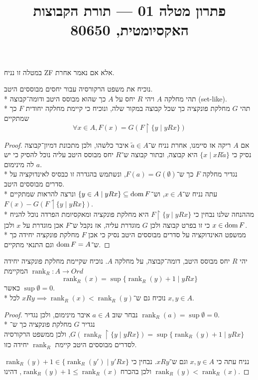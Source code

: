 
\title{פתרון מטלה 01 --- תורת הקבוצות האקסיומטית, 80650}

\DeclareMathOperator{\rank}{rank}


\maketitle
\maketitleprint{}
במטלה זו נניח ZF אלא אם נאמר אחרת.

\Question{}
נוכיח את משפט הרקורסיה עבור יחסים מבוססים היטב. \\*
תהי מחלקה $A$ ויהי $R$ יחס על $A$ כך שהוא מבוסס היטב ודומה־קבוצה (set-like). \\*
תהי $G$ מחלקת פונקציה כך שכל קבוצה במקור שלה, ונוכיח כי קיימת מחלקה יחודית $F$ כך שמתקיים
\[
	\forall x \in A, F(x) = G(F \upharpoonright \{y \mid y R x \})
\]
\begin{proof}
	אם $A$ ריקה אז סיימנו, אחרת נניח ש־$\tilde{a} \in A$ איבר כלשהו, ולכן מתכונת דמיון־קבוצה נסיק כי $\{ x \mid x R \tilde{a} \}$ היא קבוצה, ובתור קבוצה ש־$R$ יחס מבוסס היטב עליה נוכל להסיק כי יש לה מינימום $a$. \\*
	נגדיר מחלקה $F$ כך ש־$F(a) = G(\emptyset)$, ונשתמש בהגדרה זו כבסיס לאינדוקציה על סדרים מבוססים היטב. \\*
	עתה נניח ש־$x \in A$, וש־$\{ y \in A \mid y R x \} \subseteq \operatorname{dom} F$ ונרצה להראות שמתקיים $F(x) - G(F \upharpoonleft \{ y \mid y R x \})$. \\*
	מההנחה שלנו נבחין כי $F \upharpoonright \{ y \mid y R x \}$ היא מחלקת פונקציה ומאקסיומת הפרדה נוכל להניח כי זו בפרט קבוצה ולכן $G$ מוגדרת עליה, אז נקבל ש־$F$ אכן מוגדרת על $x$ ולכן $x \in \operatorname{dom} F$. \\*
	ממשפט האינדוקציה על סדרים מבוססים היטב נסיק כי אכן $F$ מחלקת פונקציה יחידה כך ש־$\operatorname{dom} F = A$ וגם התנאי מתקיים.
\end{proof}

\Question{}
\Subquestion{}
יהי $R$ יחס מבוסס היטב, דומה־קבוצה, על מחלקה $A$. 
נוכיח שקיימת מחלקת פונקציה יחידה $\rank_R : A \to Ord$ המקיימת
\[
	\rank_R(x) = \sup\{ \rank_R(y) + 1 \mid y R x \}
\]
כאשר $\sup \emptyset = 0$. \\*
נוכיח גם ש־$x R y \implies \rank_R(x) < \rank_R(y)$ לכל $x, y \in A$.
\begin{proof}
	נבחר שוב $a \in A$ איבר מינימום, ולכן נגדיר $\rank_R(a) = \sup \emptyset = 0$. \\*
	נגדיר $G$ מחלקת פונקציה כך ש־$G(\rank_R \upharpoonright \{ y \mid y R x \}) = \sup\{ \rank_R(y) + 1 \mid y R x \}$, ולכן ממשפט הרקורסיה לסדרים מבוססים היטב קיימת $\rank_R$ יחידה כזו.

	נניח עתה כי $x, y \in A$ וגם ש־$x R y$.
	נבחין כי $\rank_R(y) + 1 \in \{ \rank_R(y') \mid y' R x \}$ ולכן בהכרח $\rank_R(y) + 1 \le \rank_R(x)$, דהינו $\rank_R(y) < \rank_R(x)$.
\end{proof}

